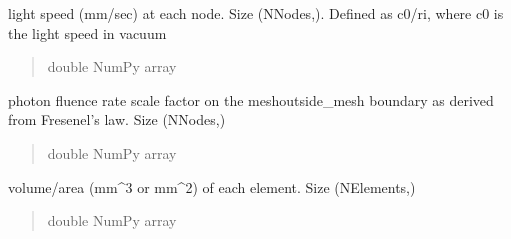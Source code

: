 \documentclass[letterpaper,10pt,english]{sphinxmanual}
\begin{document}
\begin{fulllineitems}
\begin{fulllineitems}
\begin{quote}
\begin{description}
\end{description}\end{quote}

\end{fulllineitems}


\begin{fulllineitems}
\label{\detokenize{_autosummary/nirfasterff.base.fluor_mesh.fluormesh:nirfasterff.base.fluor_mesh.fluormesh.c}}
\pysigstartsignatures
\pysigline
{}
\pysigstopsignatures
\sphinxAtStartPar
light speed (mm/sec) at each node.  Size (NNodes,). Defined as c0/ri, where c0 is the light speed in vacuum
\begin{quote}\begin{description}
\sphinxAtStartPar
double NumPy array

\end{description}\end{quote}

\end{fulllineitems}


\begin{fulllineitems}
\label{\detokenize{_autosummary/nirfasterff.base.fluor_mesh.fluormesh:nirfasterff.base.fluor_mesh.fluormesh.ksi}}
\pysigstartsignatures
\pysigline
{}
\pysigstopsignatures
\sphinxAtStartPar
photon fluence rate scale factor on the mesh\sphinxhyphen{}outside\_mesh boundary as derived from Fresenel’s law. Size (NNodes,)
\begin{quote}\begin{description}
\sphinxAtStartPar
double NumPy array

\end{description}\end{quote}

\end{fulllineitems}


\begin{fulllineitems}
\label{\detokenize{_autosummary/nirfasterff.base.fluor_mesh.fluormesh:nirfasterff.base.fluor_mesh.fluormesh.element_area}}
\pysigstartsignatures
\pysigline
{}
\pysigstopsignatures
\sphinxAtStartPar
volume/area (mm\textasciicircum{}3 or mm\textasciicircum{}2) of each element. Size (NElements,)
\begin{quote}\begin{description}
\sphinxAtStartPar
double NumPy array


\end{description}
\end{quote}
\end{fulllineitems}
\end{fulllineitems}
\end{document}
